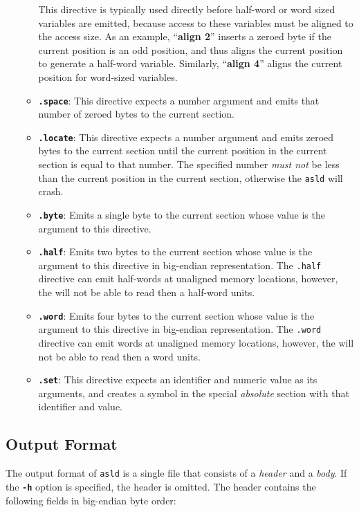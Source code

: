 \begin{itemize}
\begin{itemize}
This directive is typically used directly before half-word or word sized variables are emitted, because access to these variables must be aligned to the access size. As an example, ``{\bf align 2}'' inserts a zeroed byte if the current position is an odd position, and thus aligns the current position to generate a half-word variable. Similarly, ``{\bf align 4}'' aligns the current position for word-sized variables.
\item {\tt \bf .space}: This directive expects a number argument and emits that number of zeroed bytes to the current section.
\item {\tt \bf .locate}: This directive expects a number argument and emits zeroed bytes to the current section until the current position in the current section is equal to that number. The specified number {\it must not} be less than the current position in the current section, otherwise the {\tt asld} will crash.
\item {\tt \bf .byte}: Emits a single byte to the current section whose value is the argument to this directive.
\item {\tt \bf .half}: Emits two bytes to the current section whose value is the argument to this directive in big-endian representation. The {\tt .half} directive can emit half-words at unaligned memory locations, however, the \eco will not be able to read then a half-word units.
\item {\tt \bf .word}: Emits four bytes to the current section whose value is the argument to this directive in big-endian representation. The {\tt .word} directive can emit words at unaligned memory locations, however, the \eco will not be able to read then a word units.
\item {\tt \bf .set}: This directive expects an identifier and numeric value as its arguments, and creates a symbol in the special {\it absolute} section with that identifier and value.
\end{itemize}
\end{itemize}

\subsection{Output Format}

The output format of {\tt asld} is a single file that consists of a {\it header} and a {\it body}. If the {\tt \bf -h} option is specified, the header is omitted. The header contains the following fields in big-endian byte order:


